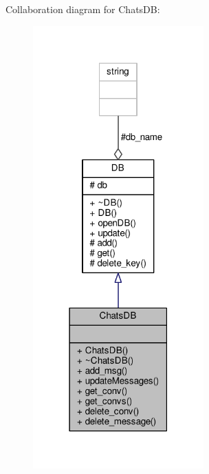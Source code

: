 Collaboration diagram for Chats\+DB\+:\nopagebreak
\begin{figure}[H]
\begin{center}
\leavevmode
\includegraphics[width=186pt]{db/db2/classChatsDB__coll__graph}
\end{center}
\end{figure}
